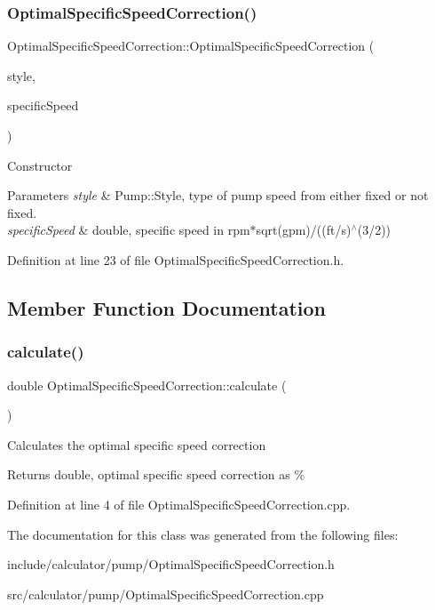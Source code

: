 \subsubsection{\texorpdfstring{Optimal\+Specific\+Speed\+Correction()}{OptimalSpecificSpeedCorrection()}}
{\footnotesize\ttfamily Optimal\+Specific\+Speed\+Correction\+::\+Optimal\+Specific\+Speed\+Correction (\begin{DoxyParamCaption}\item[{const Pump\+::\+Style}]{style,  }\item[{const double}]{specific\+Speed }\end{DoxyParamCaption})\hspace{0.3cm}{\ttfamily [inline]}}

Constructor 
\begin{DoxyParams}{Parameters}
{\em style} & Pump\+::\+Style, type of pump speed from either fixed or not fixed. \\
\hline
{\em specific\+Speed} & double, specific speed in rpm$\ast$sqrt(gpm)/((ft/s)$^\wedge$(3/2)) \\
\hline
\end{DoxyParams}


Definition at line 23 of file Optimal\+Specific\+Speed\+Correction.\+h.



\subsection{Member Function Documentation}
\mbox{\label{class_optimal_specific_speed_correction_a3337ebde4e64c20f19adbda6204fa0be}} 
\subsubsection{\texorpdfstring{calculate()}{calculate()}}
{\footnotesize\ttfamily double Optimal\+Specific\+Speed\+Correction\+::calculate (\begin{DoxyParamCaption}{ }\end{DoxyParamCaption})}

Calculates the optimal specific speed correction \begin{DoxyReturn}{Returns}
double, optimal specific speed correction as \% 
\end{DoxyReturn}


Definition at line 4 of file Optimal\+Specific\+Speed\+Correction.\+cpp.



The documentation for this class was generated from the following files\+:\begin{DoxyCompactItemize}
\item 
include/calculator/pump/Optimal\+Specific\+Speed\+Correction.\+h\item 
src/calculator/pump/Optimal\+Specific\+Speed\+Correction.\+cpp\end{DoxyCompactItemize}
